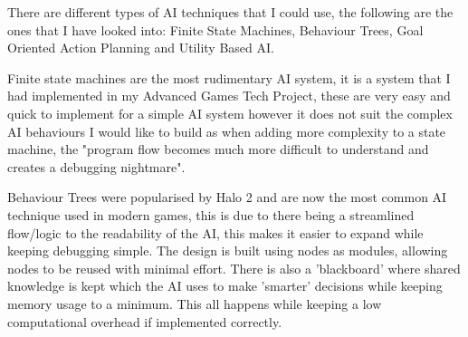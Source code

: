 \documentclass[12pt]{report}
\begin{document}
There are different types of AI techniques that I could use, the following are the ones that I have looked into: Finite State Machines, Behaviour Trees, Goal Oriented Action Planning and Utility Based AI.

Finite state machines are the most rudimentary AI system, it is a system that I had implemented in my Advanced Games Tech Project, these are very easy and quick to implement for a simple AI system however it does not suit the complex AI behaviours I would like to build as when adding more complexity to a state machine, the "program flow becomes much more difficult to understand and creates a debugging nightmare"\cite{gameAiByExample}.

Behaviour Trees were popularised by Halo 2\cite{halo2} and are now the most common AI technique used in modern games, this is due to there being a streamlined flow/logic to the readability of the AI, this makes it easier to expand while keeping debugging simple. The design is built using nodes as modules, allowing nodes to be reused with minimal effort. There is also a 'blackboard' where shared knowledge is kept which the AI uses to make 'smarter' decisions while keeping memory usage to a minimum. This all happens while keeping a low computational overhead if implemented correctly. \cite{behaviourTrees}
\end{document}
